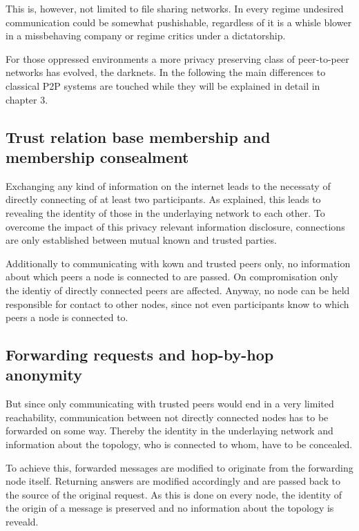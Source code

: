 This is, however, not limited to file sharing networks. In every regime undesired communication could be somewhat pushishable, regardless of it is a whisle blower in a missbehaving company or regime critics under a dictatorship. 

For those oppressed environments a more privacy preserving class of peer-to-peer networks has evolved, the darknets. In the following the main differences to classical P2P systems are touched while they will be explained in detail in chapter 3.


\subsection{Trust relation base membership and membership consealment}

Exchanging any kind of information on the internet leads to the necessaty of directly connecting of at least two participants. As explained, this leads to revealing the identity of those in the underlaying network to each other. To overcome the impact of this privacy relevant information disclosure, connections are only established between mutual known and trusted parties.

Additionally to communicating with kown and trusted peers only, no information about which peers a node is connected to are passed. On compromisation only the identiy of directly connected peers are affected. Anyway, no node can be held responsible for contact to other nodes, since not even participants know to which peers a node is connected to.

\subsection{Forwarding requests and hop-by-hop anonymity}

But since only communicating with trusted peers would end in a very limited reachability, communication between not directly connected nodes has to be forwarded on some way. Thereby the identity in the underlaying network and information about the topology, who is connected to whom, have to be concealed.

To achieve this, forwarded messages are modified to originate from the forwarding node itself. Returning answers are modified accordingly and are passed back to the source of the original request. As this is done on every node, the identity of the origin of a message is preserved and no information about the topology is reveald.



